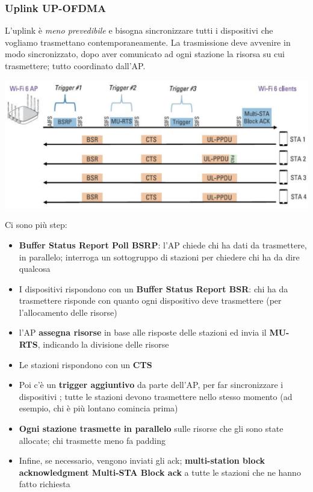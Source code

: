 \newpage

\subsubsection{Uplink UP-OFDMA}
L'uplink è \textit{meno prevedibile} e bisogna sincronizzare tutti i dispositivi che vogliamo trasmettano contemporaneamente. La trasmissione deve avvenire in modo sincronizzato, dopo aver comunicato ad ogni stazione la risorsa su cui trasmettere; tutto coordinato dall'AP.
\begin{center}
	\includegraphics[width=0.85\linewidth]{img/wlan/uplink}
\end{center}

Ci sono più step:
\begin{itemize}
	\item \textbf{Buffer Status Report Poll BSRP}: l'AP chiede chi ha dati da trasmettere, in parallelo; interroga un sottogruppo di stazioni per chiedere chi ha da dire qualcosa
	\item I dispositivi rispondono con un \textbf{Buffer Status Report BSR}: chi ha da trasmettere risponde con quanto ogni dispositivo deve trasmettere (per l'allocamento delle risorse)
	\item l'AP \textbf{assegna risorse} in base alle risposte delle stazioni ed invia il \textbf{MU-RTS}, indicando la divisione delle risorse
	\item Le stazioni rispondono con un \textbf{CTS}
	\item Poi c'è un \textbf{trigger aggiuntivo} da parte dell'AP, per far sincronizzare i dispositivi ; tutte le stazioni devono trasmettere nello stesso momento (ad esempio, chi è più lontano comincia prima)
	\item \textbf{Ogni stazione trasmette in parallelo} sulle risorse che gli sono state allocate; chi trasmette meno fa padding
	\item Infine, se necessario, vengono inviati gli ack; \textbf{multi-station block acknowledgment Multi-STA Block ack} a tutte le stazioni che ne hanno fatto richiesta
\end{itemize}

